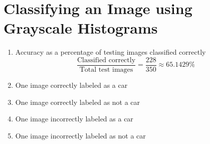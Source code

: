 \documentclass{article}
\begin{document}
\section{Classifying an Image using Grayscale Histograms}
\begin{enumerate}
\item Accuracy as a percentage of testing images classified correctly
\newline
$$ \frac{\text{Classified correctly}}{\text{Total test images}} = \frac{228}{350} \approx 65.1429\%  $$

\item One image correctly labeled as a car
\begin{figure}[h!]
\end{figure}

\item One image correctly labeled as not a car
\begin{figure}[h!]
\end{figure}

\item One image incorrectly labeled as a car
\begin{figure}[h!]
\end{figure}

\item One image incorrectly labeled as not a car
\begin{figure}[h!]
\end{figure}
\end{enumerate}
\end{document}

